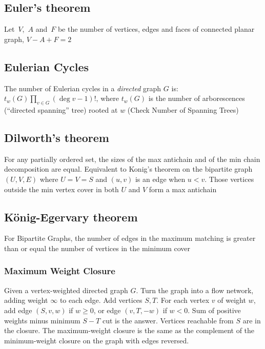 \iffalse
\subsection{Landau}
There are a tournament with outdegree~$d_1 \leq d_2 \leq \ldots \leq d_n$ iff:
\begin{itemize}
\item $d_1 + d_2 + \ldots + d_n = \binom{n}{2}$

\item $d_1 + d_2 + \ldots + d_k \geq \binom{k}{2} \quad \forall 1 \leq k \leq n.$
\end{itemize}
In order to build, lets make~1 point to~$2, 3, \ldots, d_1 + 1$ and we follow recursively
\fi

\subsection{Euler's theorem}
Let~$V$,~$A$ and~$F$ be the number of vertices, edges and faces of connected planar graph, $V - A + F = 2$

\subsection{Eulerian Cycles}
The number of Eulerian cycles in a \emph{directed} graph $G$ is: $t_w(G) \prod_{v \in G} (\deg v - 1)!$,
where $t_w(G)$ is the number of arborescences (``directed spanning'' tree) rooted at $w$
(Check Number of Spanning Trees)

\subsection{Dilworth's theorem}
For any partially ordered set, the sizes of the max antichain and of the min chain decomposition are equal. Equivalent to Konig's theorem on the bipartite graph $(U,V,E)$ where $U=V=S$ and $(u,v)$ is an edge when $u<v$. Those vertices outside the min vertex cover in both $U$ and $V$ form a max antichain

\subsection{König-Egervary theorem}
For Bipartite Graphs, the number of edges in the maximum matching is greater than or equal the number of vertices in the minimum cover


\subsubsection{Maximum Weight Closure}
Given a vertex-weighted directed graph $G$. Turn the graph into a flow
network, adding weight $\infty$ to each edge. Add vertices $S,T$. For
each vertex $v$ of weight $w$, add edge $(S,v,w)$ if $w\geq 0$, or edge
$(v,T,-w)$ if $w<0$. Sum of positive weights minus minimum $S-T$ cut is
the answer. Vertices reachable from $S$ are in the closure. The
maximum-weight closure is the same as the complement of the
minimum-weight closure on the graph with edges reversed.

